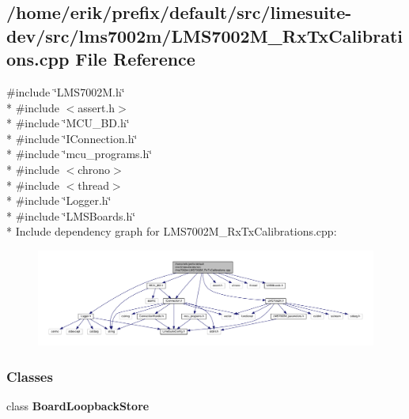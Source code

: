 \subsection{/home/erik/prefix/default/src/limesuite-\/dev/src/lms7002m/\+L\+M\+S7002\+M\+\_\+\+Rx\+Tx\+Calibrations.cpp File Reference}
\label{LMS7002M__RxTxCalibrations_8cpp}
{\ttfamily \#include \char`\"{}L\+M\+S7002\+M.\+h\char`\"{}}\\*
{\ttfamily \#include $<$assert.\+h$>$}\\*
{\ttfamily \#include \char`\"{}M\+C\+U\+\_\+\+B\+D.\+h\char`\"{}}\\*
{\ttfamily \#include \char`\"{}I\+Connection.\+h\char`\"{}}\\*
{\ttfamily \#include \char`\"{}mcu\+\_\+programs.\+h\char`\"{}}\\*
{\ttfamily \#include $<$chrono$>$}\\*
{\ttfamily \#include $<$thread$>$}\\*
{\ttfamily \#include \char`\"{}Logger.\+h\char`\"{}}\\*
{\ttfamily \#include \char`\"{}L\+M\+S\+Boards.\+h\char`\"{}}\\*
Include dependency graph for L\+M\+S7002\+M\+\_\+\+Rx\+Tx\+Calibrations.\+cpp\+:
\nopagebreak
\begin{figure}[H]
\begin{center}
\leavevmode
\includegraphics[width=350pt]{dc/dec/LMS7002M__RxTxCalibrations_8cpp__incl}
\end{center}
\end{figure}
\subsubsection*{Classes}
\begin{DoxyCompactItemize}
\item 
class {\bf Board\+Loopback\+Store}
\end{DoxyCompactItemize}
